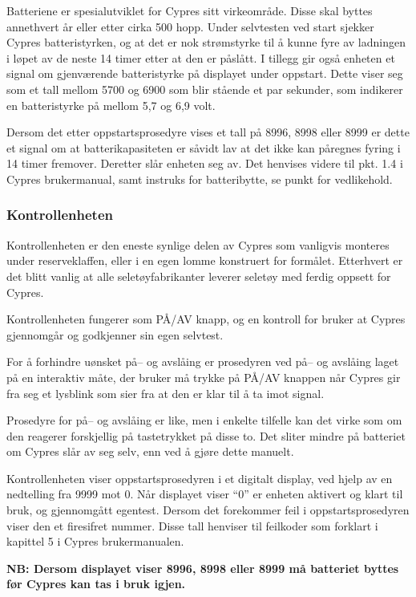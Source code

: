 Batteriene er spesialutviklet for Cypres sitt virkeområde. Disse skal byttes annethvert år eller etter cirka 500 hopp. Under selvtesten ved start sjekker Cypres batteristyrken, og at det er nok strømstyrke til å kunne fyre av ladningen i løpet av de neste 14 timer etter at den er påslått. I tillegg gir også enheten et signal om gjenværende batteristyrke på displayet under oppstart. Dette viser seg som et tall mellom 5700 og 6900 som blir stående et par sekunder, som indikerer en batteristyrke på mellom 5,7 og 6,9 volt.

Dersom det etter oppstartsprosedyre vises et tall på 8996, 8998 eller 8999 er dette et signal om at batterikapasiteten er såvidt lav at det ikke kan påregnes fyring i 14 timer fremover. Deretter slår enheten seg av. Det henvises videre til pkt. 1.4 i Cypres brukermanual, samt instruks for batteribytte, se punkt for vedlikehold.

\subsubsection{Kontrollenheten}
Kontrollenheten er den eneste synlige delen av Cypres som vanligvis monteres under reserveklaffen, eller i en egen lomme konstruert for formålet. Etterhvert er det blitt vanlig at alle seletøyfabrikanter leverer seletøy med ferdig oppsett for Cypres.

Kontrollenheten fungerer som PÅ/AV knapp, og en kontroll for bruker at Cypres gjennomgår og godkjenner sin egen selvtest.

For å forhindre uønsket på– og avslåing er prosedyren ved på– og avslåing laget på en interaktiv måte, der bruker må trykke på PÅ/AV knappen når Cypres gir fra seg et lysblink som sier fra at den er klar til å ta imot signal.

Prosedyre for på– og avslåing er like, men i enkelte tilfelle kan det virke som om den reagerer forskjellig på tastetrykket på disse to. Det sliter mindre på batteriet om Cypres slår av seg selv, enn ved å gjøre dette manuelt.

Kontrollenheten viser oppstartsprosedyren i et digitalt display, ved hjelp av en nedtelling fra 9999 mot 0. Når displayet viser ``0'' er enheten aktivert og klart til bruk, og gjennomgått egentest. Dersom det forekommer feil i oppstartsprosedyren viser den et firesifret nummer. Disse tall henviser til feilkoder som forklart i kapittel 5 i Cypres brukermanualen.

\textbf{NB: Dersom displayet viser 8996, 8998 eller 8999 må batteriet byttes før Cypres kan tas i bruk igjen.}

